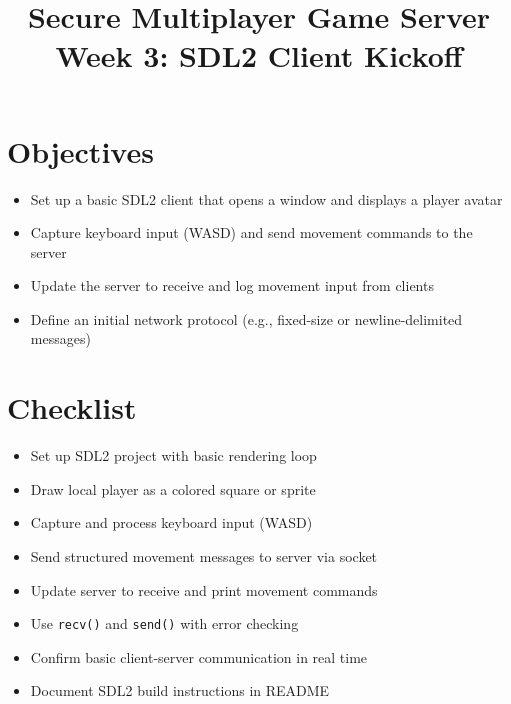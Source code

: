 \documentclass[12pt]{article}
\title{Secure Multiplayer Game Server\\\large Week 3: SDL2 Client Kickoff}
\author{}
\date{}
\begin{document}
\maketitle

\section*{Objectives}
\begin{itemize}
    \item Set up a basic SDL2 client that opens a window and displays a player avatar
    \item Capture keyboard input (WASD) and send movement commands to the server
    \item Update the server to receive and log movement input from clients
    \item Define an initial network protocol (e.g., fixed-size or newline-delimited messages)
\end{itemize}

\section*{Checklist}
\begin{itemize}[label=$\square$]
    \item Set up SDL2 project with basic rendering loop
    \item Draw local player as a colored square or sprite
    \item Capture and process keyboard input (WASD)
    \item Send structured movement messages to server via socket
    \item Update server to receive and print movement commands
    \item Use \texttt{recv()} and \texttt{send()} with error checking
    \item Confirm basic client-server communication in real time
    \item Document SDL2 build instructions in README
\end{itemize}
\end{document}
